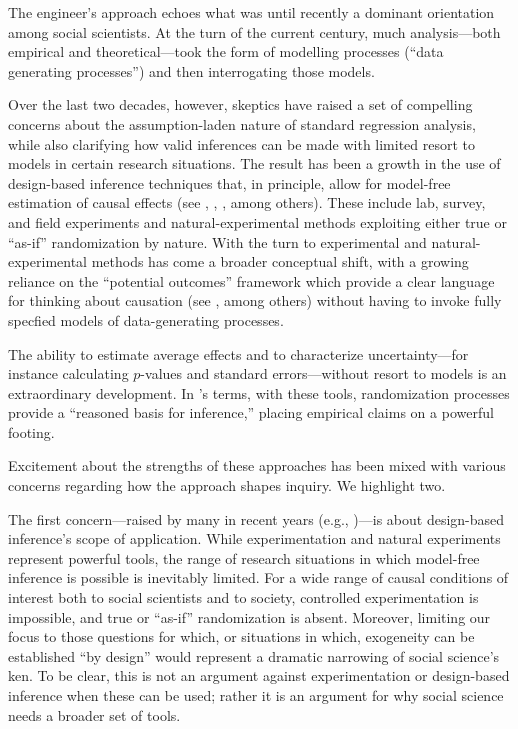 \documentclass[
  12pt,
]{book}
\begin{document}
The engineer's approach echoes what was until recently a dominant orientation among social scientists. At the turn of the current century, much analysis---both empirical and theoretical---took the form of modelling processes (``data generating processes'') and then interrogating those models.

Over the last two decades, however, skeptics have raised a set of compelling concerns about the assumption-laden nature of standard regression analysis, while also clarifying how valid inferences can be made with limited resort to models in certain research situations. The result has been a growth in the use of design-based inference techniques that, in principle, allow for model-free estimation of causal effects (see \citet{dunning2012natural}, \citet{GerGreKap04}, \citet{druckman2011experimentation}, \citet{palfrey2009laboratory} among others). These include lab, survey, and field experiments and natural-experimental methods exploiting either true or ``as-if'' randomization by nature. With the turn to experimental and natural-experimental methods has come a broader conceptual shift, with a growing reliance on the ``potential outcomes'' framework which provide a clear language for thinking about causation (see \citet{Rubin1974}, \citet{splawa1990application} among others) without having to invoke fully specfied models of data-generating processes.

The ability to estimate average effects and to characterize uncertainty---for instance calculating \(p\)-values and standard errors---without resort to models is an extraordinary development. In \citet{fisher1935design}'s terms, with these tools, randomization processes provide a ``reasoned basis for inference,'' placing empirical claims on a powerful footing.

Excitement about the strengths of these approaches has been mixed with various concerns regarding how the approach shapes inquiry. We highlight two.

The first concern---raised by many in recent years (e.g., \citet{thelen2015comparative})---is about design-based inference's scope of application. While experimentation and natural experiments represent powerful tools, the range of research situations in which model-free inference is possible is inevitably limited. For a wide range of causal conditions of interest both to social scientists and to society, controlled experimentation is impossible, and true or ``as-if'' randomization is absent. Moreover, limiting our focus to those questions for which, or situations in which, exogeneity can be established ``by design'' would represent a dramatic narrowing of social science's ken. To be clear, this is not an argument against experimentation or design-based inference when these can be used; rather it is an argument for why social science needs a broader set of tools.
\end{document}
